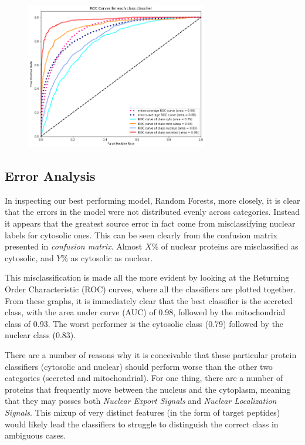 \documentclass{bioinfo}
\begin{document}
\begin{figure}[!h]
\includegraphics[width=8cm]{roc_curve}
\centering
\end{figure}

\subsection{Error Analysis}

In inspecting our best performing model, Random Forests, more closely, it is clear that the errors in the model were not distributed evenly across categories.
Instead it appears that the greatest source error in fact come from misclassifying nuclear labels for cytosolic ones. This can be seen clearly from the confusion matrix presented in \textit{confusion matrix}. Almost $X\%$ of nuclear proteins are misclassified as cytosolic, and $Y\%$ as cytosolic as nuclear.

This misclassification is made all the more evident by looking at the Returning Order Characteristic (ROC) curves, where all the classifiers are plotted together. 
From these graphs, it is immediately clear that the best classifier is the secreted class, with the area under curve (AUC) of 0.98, followed by the mitochondrial class of 0.93. The worst performer is the cytosolic class (0.79) followed by the nuclear class (0.83).

There are a number of reasons why it is conceivable that these particular protein classifiers (cytosolic and nuclear) should perform worse than the other two categories (secreted and mitochondrial). 
For one thing, there are a number of proteins that frequently move between the nucleus and the cytoplasm, meaning that they may posses both \textit{Nuclear Export Signals} and \textit{Nuclear Localization Signals}. 
This mixup of very distinct features (in the form of target peptides) would likely lead the classifiers to struggle to distinguish the correct class in ambiguous cases.
\end{document}
